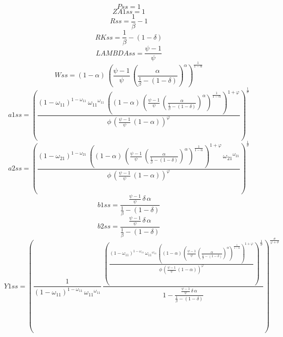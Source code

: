 \begin{dmath*}
Pss = 1
\end{dmath*}
\begin{dmath*}
ZA1ss = 1
\end{dmath*}
\begin{dmath*}
Rss = \frac{1}{{{\beta}}}-1
\end{dmath*}
\begin{dmath*}
RKss = \frac{1}{{{\beta}}}-\left(1-{{\delta}}\right)
\end{dmath*}
\begin{dmath*}
LAMBDAss = \frac{{{\psi}}-1}{{{\psi}}}
\end{dmath*}
\begin{dmath*}
Wss = \left(1-{{\alpha}}\right)\, \left(\frac{{{\psi}}-1}{{{\psi}}}\, \left(\frac{{{\alpha}}}{\frac{1}{{{\beta}}}-\left(1-{{\delta}}\right)}\right)^{{{\alpha}}}\right)^{\frac{1}{1-{{\alpha}}}}
\end{dmath*}
\begin{dmath*}
a1ss = \left(\frac{\left(1-{{\omega_{11}}}\right)^{1-{{\omega_{11}}}}\, {{\omega_{11}}}^{{{\omega_{11}}}}\, \left(\left(1-{{\alpha}}\right)\, \left(\frac{{{\psi}}-1}{{{\psi}}}\, \left(\frac{{{\alpha}}}{\frac{1}{{{\beta}}}-\left(1-{{\delta}}\right)}\right)^{{{\alpha}}}\right)^{\frac{1}{1-{{\alpha}}}}\right)^{1+{{\varphi}}}}{{{\phi}}\, \left(\frac{{{\psi}}-1}{{{\psi}}}\, \left(1-{{\alpha}}\right)\right)^{{{\varphi}}}}\right)^{\frac{1}{{{\sigma}}}}
\end{dmath*}
\begin{dmath*}
a2ss = \left(\frac{\left(1-{{\omega_{21}}}\right)^{1-{{\omega_{21}}}}\, \left(\left(1-{{\alpha}}\right)\, \left(\frac{{{\psi}}-1}{{{\psi}}}\, \left(\frac{{{\alpha}}}{\frac{1}{{{\beta}}}-\left(1-{{\delta}}\right)}\right)^{{{\alpha}}}\right)^{\frac{1}{1-{{\alpha}}}}\right)^{1+{{\varphi}}}\, {{\omega_{21}}}^{{{\omega_{21}}}}}{{{\phi}}\, \left(\frac{{{\psi}}-1}{{{\psi}}}\, \left(1-{{\alpha}}\right)\right)^{{{\varphi}}}}\right)^{\frac{1}{{{\sigma}}}}
\end{dmath*}
\begin{dmath*}
b1ss = \frac{\frac{{{\psi}}-1}{{{\psi}}}\, {{\delta}}\, {{\alpha}}}{\frac{1}{{{\beta}}}-\left(1-{{\delta}}\right)}
\end{dmath*}
\begin{dmath*}
b2ss = \frac{\frac{{{\psi}}-1}{{{\psi}}}\, {{\delta}}\, {{\alpha}}}{\frac{1}{{{\beta}}}-\left(1-{{\delta}}\right)}
\end{dmath*}
\begin{dmath*}
Y1ss = \left(\frac{1}{\left(1-{{\omega_{11}}}\right)^{1-{{\omega_{11}}}}\, {{\omega_{11}}}^{{{\omega_{11}}}}}\, \frac{\left(\frac{\left(1-{{\omega_{11}}}\right)^{1-{{\omega_{11}}}}\, {{\omega_{11}}}^{{{\omega_{11}}}}\, \left(\left(1-{{\alpha}}\right)\, \left(\frac{{{\psi}}-1}{{{\psi}}}\, \left(\frac{{{\alpha}}}{\frac{1}{{{\beta}}}-\left(1-{{\delta}}\right)}\right)^{{{\alpha}}}\right)^{\frac{1}{1-{{\alpha}}}}\right)^{1+{{\varphi}}}}{{{\phi}}\, \left(\frac{{{\psi}}-1}{{{\psi}}}\, \left(1-{{\alpha}}\right)\right)^{{{\varphi}}}}\right)^{\frac{1}{{{\sigma}}}}}{1-\frac{\frac{{{\psi}}-1}{{{\psi}}}\, {{\delta}}\, {{\alpha}}}{\frac{1}{{{\beta}}}-\left(1-{{\delta}}\right)}}\right)^{\frac{{{\sigma}}}{{{\varphi}}+{{\sigma}}}}
\end{dmath*}

